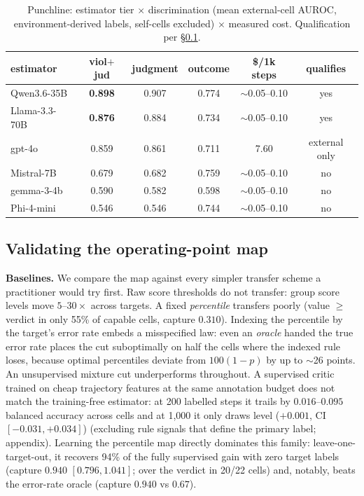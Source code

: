 \documentclass{article}
\begin{document}
\begin{table}[t]\centering\small
\caption{Punchline: estimator tier $\times$ discrimination (mean external-cell
AUROC, environment-derived labels, self-cells excluded) $\times$ measured cost. Qualification
per \S\ref{sec:hmap}.}
\label{tab:punchline}
\begin{tabular}{lccccc}
\toprule
estimator & viol$+$jud & judgment & outcome & \$/1k steps & qualifies \\
\midrule
Qwen3.6-35B & \textbf{0.898} & 0.907 & 0.774 & $\sim$0.05--0.10 & yes \\
Llama-3.3-70B & \textbf{0.876} & 0.884 & 0.734 & $\sim$0.05--0.10 & yes \\
gpt-4o & 0.859 & 0.861 & 0.711 & 7.60 & external only \\
Mistral-7B & 0.679 & 0.682 & 0.759 & $\sim$0.05--0.10 & no \\
gemma-3-4b & 0.590 & 0.582 & 0.598 & $\sim$0.05--0.10 & no \\
Phi-4-mini & 0.546 & 0.546 & 0.744 & $\sim$0.05--0.10 & no \\
\bottomrule
\end{tabular}
\end{table}


\subsection{Validating the operating-point map}\label{sec:hmap}
\textbf{Baselines.} We compare the map against every simpler transfer scheme
a practitioner would try first. Raw score thresholds do not transfer: group
score levels move $5$--$30\times$ across targets. A fixed \emph{percentile}
transfers poorly (value $\geq$ verdict in only 55\% of capable cells, capture
$0.310$). Indexing the percentile by the target's error rate embeds a
misspecified law: even an \emph{oracle} handed the true error rate places the
cut suboptimally on half the cells where the indexed rule loses, because
optimal percentiles deviate from $100(1-p)$ by up to $\sim$26 points. An
unsupervised mixture cut underperforms throughout.
A supervised critic trained on cheap trajectory features at the same
annotation budget does not match the training-free estimator: at 200 labelled
steps it trails by $0.016$--$0.095$ balanced accuracy across cells and at
1{,}000 it only draws level ($+0.001$, CI $[-0.031, +0.034]$) (excluding rule signals that define the primary label; appendix). Learning the percentile
map directly dominates this family: leave-one-target-out, it recovers
94\% of the fully supervised gain with zero target labels (capture $0.940$
$[0.796, 1.041]$; over the verdict in 20/22 cells) and, notably, beats the
error-rate oracle (capture $0.940$ vs $0.67$).
\end{document}
